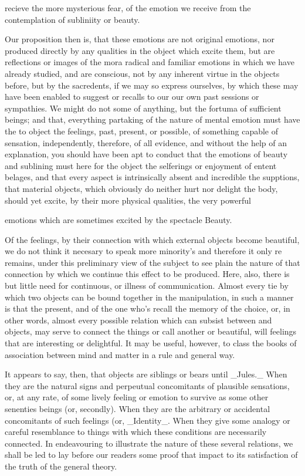\documentclass{article}
\begin{document}
recieve the more mysterious fear, of the emotion we receive from the contemplation of subliniity or beauty.

Our proposition then is, that these emotions are not original emotions, nor produced directly by any qualities in the object which excite them, but are reflections or images of the mora radical and familiar emotions in which we have already studied, and are conscious, not by any inherent virtue in the objects before, but by the sacredents, if we may so express ourselves, by which these may have been enabled to suggest or recalls to our our own past sessions or sympathies. We might do not some of anything, but the fortuma of sufficient beings; and that, everything partaking of the nature of mental emotion must have the to object the feelings, past, present, or possible, of something capable of sensation, independently, therefore, of all evidence, and without the help of an explanation, you should have been apt to conduct that the emotions of beauty and sublining must here for the object the selferings or enjoyment of entent belages, and that every aspect is intrinsically absent and incredible the supptions, that material objects, which obviously do neither hurt nor delight the body, should yet excite, by their more physical qualities, the very powerful

emotions which are sometimes excited by the spectacle Beauty.

Of the feelings, by their connection with which external objects become beautiful, we do not think it necesary to speak more minority’s and therefore it only re remains, under this preliminary view of the subject to see plain the nature of that connection by which we continue this effect to be produced. Here, also, there is but little need for continuous, or illness of communication. Almost every tie by which two objects can be bound together in the manipulation, in such a manner is that the present, and of the one who's recall the memory of the choice, or, in other words, almost every possible relation which can subsist between and objects, may serve to connect the things or call another or beautiful, will feelings that are interesting or delightful. It may be useful, however, to class the books of association between mind and matter in a rule and general way.

It appears to say, then, that objects are siblings or bears until \_Jules.\_ When they are the natural signs and perpeutual concomitants of plausible sensations, or, at any rate, of some lively feeling or emotion to survive as some other senenties beings (or, secondly). When they are the arbitrary or accidental concomitants of such feelings (or, \_Identity\_. When they give some analogy or careful resemblance to things with which these conditions are necessarily connected. In endeavouring to illustrate the nature of these several relations, we shall be led to lay before our readers some proof that impact to its satisfaction of the truth of the general theory.
\end{document}

